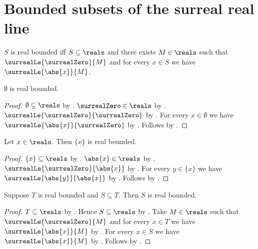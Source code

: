 \section{Bounded subsets of the surreal real line}











\begin{definition}\label{real_bounded}
    $S$ is real bounded iff
        $S\subseteq\reals$ and there exists $M\in\reals$ such that
            $\surrealLe{\surrealZero}{M}$ and
            for every $x\in S$ we have $\surrealLe{\abs{x}}{M}$.
\end{definition}

\begin{proposition}\label{empty_real_set_is_bounded}
    $\emptyset$ is real bounded.
\end{proposition}
\begin{proof}
    $\emptyset\subseteq\reals$ by .
    $\surrealZero\in\reals$ by .
    $\surrealLe{\surrealZero}{\surrealZero}$
        by .
    For every $x\in\emptyset$ we have
        $\surrealLe{\abs{x}}{\surrealZero}$ by .
    Follows by .
\end{proof}

\begin{proposition}\label{singleton_real_set_is_bounded}
    Let $x\in\reals$.
    Then $\{x\}$ is real bounded.
\end{proposition}
\begin{proof}
    $\{x\}\subseteq\reals$ by .
    $\abs{x}\in\reals$ by .
    $\surrealLe{\surrealZero}{\abs{x}}$ by
        .
    For every $y\in\{x\}$ we have
        $\surrealLe{\abs{y}}{\abs{x}}$
        by .
    Follows by .
\end{proof}

\begin{theorem}\label{subset_of_real_bounded_is_bounded}
    Suppose $T$ is real bounded and $S\subseteq T$.
    Then $S$ is real bounded.
\end{theorem}
\begin{proof}
    $T\subseteq\reals$ by .
    Hence $S\subseteq\reals$ by .
    Take $M\in\reals$ such that $\surrealLe{\surrealZero}{M}$ and
        for every $x\in T$ we have $\surrealLe{\abs{x}}{M}$
        by .
    For every $x\in S$ we have $\surrealLe{\abs{x}}{M}$
        by .
    Follows by .
\end{proof}

